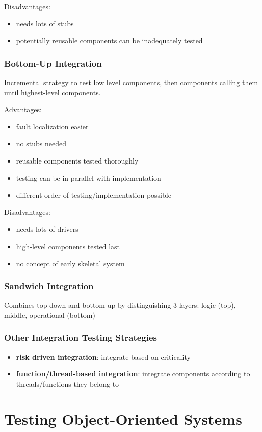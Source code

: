 \documentclass[11pt]{article}
\begin{document}
Disadvantages:
\begin{itemize}
\item needs lots of stubs
\item potentially reusable components can be inadequately tested
\end{itemize}
\subsubsection{Bottom-Up Integration}
\label{sec:orgb72f1b7}
Incremental strategy to test low level components, then components calling
them until highest-level components.

Advantages:
\begin{itemize}
\item fault localization easier
\item no stubs needed
\item reusable components tested thoroughly
\item testing can be in parallel with implementation
\item different order of testing/implementation possible
\end{itemize}

Disadvantages:
\begin{itemize}
\item needs lots of drivers
\item high-level components tested last
\item no concept of early skeletal system
\end{itemize}
\subsubsection{Sandwich Integration}
\label{sec:org3e753f5}
Combines top-down and bottom-up by distinguishing 3 layers: logic (top), middle,
operational (bottom)
\subsubsection{Other Integration Testing Strategies}
\label{sec:orgd124167}
\begin{itemize}
\item \textbf{risk driven integration}: integrate based on criticality
\item \textbf{function/thread-based integration}: integrate components according to
threads/functions they belong to
\end{itemize}
\section{Testing Object-Oriented Systems}
\label{sec:org8e13734}
\end{document}
